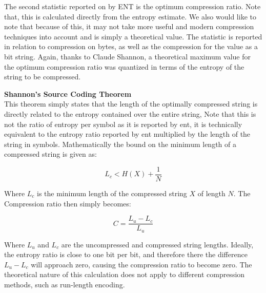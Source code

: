 \documentclass{IEEEtran}
\newenvironment{definition}[1][Definition]{\begin{trivlist}
\item[\hskip \labelsep {\bfseries #1}]}{\end{trivlist}}
\begin{document}
The second statistic reported on by ENT is the optimum compression ratio. Note that, this is calculated directly from the entropy estimate. We also would like to note that because of this, it may not take more useful and modern compression techniques into account and is simply a theoretical value. The statistic is reported in relation to compression on bytes, as well as the compression for the value as a bit string. Again, thanks to Claude Shannon, a theoretical maximum value for the optimum compression ratio was quantized in terms of the entropy of the string to be compressed. 

\begin{definition}
\textbf{Shannon's Source Coding Theorem} \\
This theorem simply states that the length of the optimally compressed string is directly related to the entropy contained over the entire string, Note that this is not the ratio of entropy per symbol as it is reported by ent, it is technically equivalent to the entropy ratio reported by ent multiplied by the length of the string in symbols. Mathematically the bound on the minimum length of a compressed string is given as: 

$$L_c < H(X) + \frac{1}{N}$$

Where $L_c$ is the minimum length of the compressed string $X$ of length $N$. The Compression ratio then simply becomes: 

$$C= \frac{L_u - L_c}{L_u}$$
\end{definition}
Where $L_u$ and $L_c$ are the uncompressed and compressed string lengths. Ideally, the entropy ratio is close to one bit per bit, and therefore there the difference $L_u-L_c$ will approach zero, causing the compression ratio to become zero. The theoretical nature of this calculation does not apply to different compression methods, such as run-length encoding. 
\end{document}

